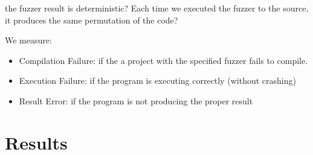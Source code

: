 \documentclass[10pt]{sigplanconf}
\begin{document}
the fuzzer result is deterministic? Each time we executed the fuzzer to the source, it produces the same permutation of the code?

We measure:

\begin{itemize}
	\item Compilation Failure: if the a project with the specified fuzzer fails to compile.
	\item Execution Failure: if the program is executing correctly (without crashing)
	\item Result Error: if the program is not producing the proper result
\end{itemize}


\section{Results} %
\label{sec:results}
\end{document}
